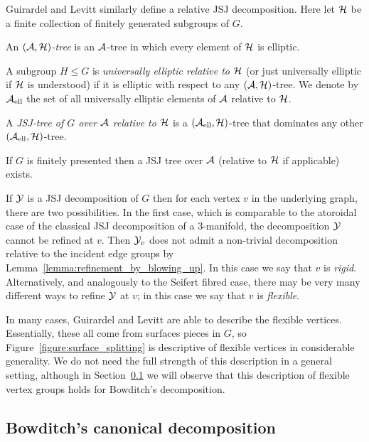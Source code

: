 Guirardel and Levitt similarly define a relative JSJ decomposition.
Here let $\mathcal{H}$ be a finite collection of finitely generated subgroups of $G$.

\begin{definition}\cite{guirardellevitt17}
  An \emph{$(\mathcal{A},\mathcal{H})$-tree} is an $\mathcal{A}$-tree in which every element of $\mathcal{H}$ is elliptic.

  A subgroup $H \leq G$ is \emph{universally elliptic relative to $\mathcal{H}$} (or just universally elliptic if $\mathcal{H}$ is understood) if it is elliptic with respect to any $(\mathcal{A},\mathcal{H})$-tree.
  We denote by $\mathcal{A}_{\mathrm{ell}}$ the set of all universally elliptic elements of $\mathcal{A}$ relative to $\mathcal{H}$.

  A \emph{JSJ-tree of $G$ over $\mathcal{A}$ relative to $\mathcal{H}$} is a $(\mathcal{A}_{\mathrm{ell}},\mathcal{H})$-tree that dominates any other $(\mathcal{A}_{\mathrm{ell}},\mathcal{H})$-tree. 
\end{definition}

\begin{theorem}\cite[Theorem 2.16 or Theorem 2.20]{guirardellevitt17}
  If $G$ is finitely presented then a JSJ tree over $\mathcal{A}$ (relative to $\mathcal{H}$ if applicable) exists. 
\end{theorem}

If $\mathcal{Y}$ is a JSJ decomposition of $G$ then for each vertex $v$ in the underlying graph, there are two possibilities.
In the first case, which is comparable to the atoroidal case of the classical JSJ decomposition of a 3-manifold, the decomposition $\mathcal{Y}$ cannot be refined at $v$. 
Then $\mathcal{Y}_v$ does not admit a non-trivial decomposition relative to the incident edge groups by Lemma~\ref{lemma:refinement_by_blowing_up}.
In this case we say that $v$ is \emph{rigid}.
Alternatively, and analogously to the Seifert fibred case, there may be very many different ways to refine $\mathcal{Y}$ at $v$; in this case we say that $v$ is \emph{flexible}.

In many cases, Guirardel and Levitt are able to describe the flexible vertices.
Essentially, these all come from surfaces pieces in $G$, so Figure~\ref{figure:surface_splitting} is descriptive of flexible vertices in considerable generality.
We do not need the full strength of this description in a general setting, although in Section~\ref{section:bowditch_decomposition} we will observe that this description of flexible vertex groups holds for Bowditch's decomposition.

\subsection{Bowditch's canonical decomposition}\label{section:bowditch_decomposition}

